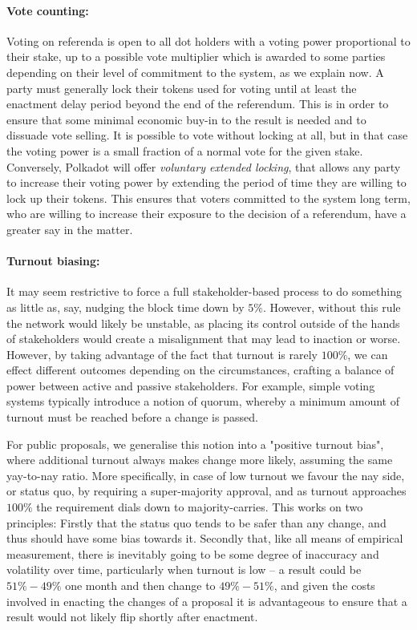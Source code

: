 \paragraph{Vote counting:} Voting on referenda is open to all dot holders with a voting power proportional to their stake, up to a possible vote multiplier which is awarded to some parties depending on their level of commitment to the system, as we explain now. A party must generally lock their tokens used for voting until at least the enactment delay period beyond the end of the referendum. This is in order to ensure that some minimal economic buy-in to the result is needed and to dissuade vote selling. It is possible to vote without locking at all, but in that case the voting power is a small fraction of a normal vote for the given stake. Conversely, Polkadot will offer \emph{voluntary extended locking}, that allows any party to increase their voting power by extending the period of time they are willing to lock up their tokens. This ensures that voters committed to the system long term, who are willing to increase their exposure to the decision of a referendum, have a greater say in the matter. 

\paragraph{Turnout biasing:} It may seem restrictive to force a full stakeholder-based process to do something as little as, say, nudging the block time down by $5\%$. However, without this rule the network would likely be unstable, as placing its control outside of the hands of stakeholders would create a misalignment that may lead to inaction or worse. However, by taking advantage of the fact that turnout is rarely $100\%$, we can effect different outcomes depending on the circumstances, crafting a balance of power between active and passive stakeholders. For example, simple voting systems typically introduce a notion of quorum, whereby a minimum amount of turnout must be reached before a change is passed. 

For public proposals, we generalise this notion into a "positive turnout bias", where additional turnout always makes change more likely, assuming the same yay-to-nay ratio. More specifically, in case of low turnout we favour the nay side, or status quo, by requiring a super-majority approval, and as turnout approaches $100\%$ the requirement dials down to majority-carries. This works on two principles: Firstly that the status quo tends to be safer than any change, and thus should have some bias towards it. Secondly that, like all means of empirical measurement, there is inevitably going to be some degree of inaccuracy and volatility over time, particularly when turnout is low -- a result could be $51\%-49\%$ one month and then change to $49\%-51\%$, and given the costs involved in enacting the changes of a proposal it is advantageous to ensure that a result would not likely flip shortly after enactment. 

